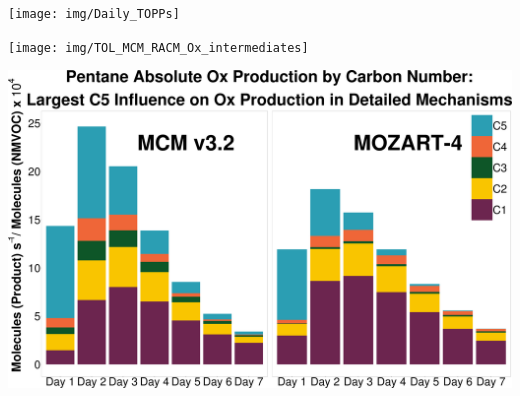 \begin{GreyBox}
    \vskip-1cm
    \begin{block}{}

        \begin{center}
            \vskip-1cm
            \texttt{[image: img/Daily\_TOPPs]}
        \end{center}
        \vspace{1.5cm}
        \begin{flushright}
            \texttt{[image: img/TOL\_MCM\_RACM\_Ox\_intermediates]}
        \end{flushright}
        \vspace{1.5cm}
        \begin{flushleft}
            \includegraphics{img/pentane_carbon_breakdown}
        \end{flushleft} 

\end{block}
\end{GreyBox}
